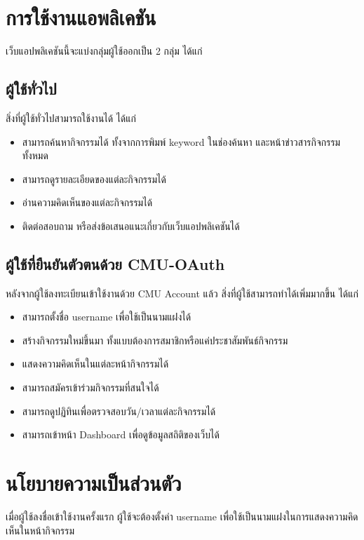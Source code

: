 \section{การใช้งานแอพลิเคชัน}
เว็บแอปพลิเคชันนี้จะแบ่งกลุ่มผู้ใช้ออกเป็น 2 กลุ่ม ได้แก่
\subsection{ผู้ใช้ทั่วไป}
สิ่งที่ผู้ใช้ทั่วไปสามารถใช้งานได้ ได้แก่
\begin{itemize}
    \item สามารถค้นหากิจกรรมได้ ทั้งจากการพิมพ์ keyword ในช่องค้นหา และหน้าข่าวสารกิจกรรมทั้งหมด
    \item สามารถดูรายละเอียดของแต่ละกิจกรรมได้
    \item อ่านความคิดเห็นของแต่ละกิจกรรมได้
    \item ติดต่อสอบถาม หรือส่งข้อเสนอแนะเกี่ยวกับเว็บแอปพลิเคชันได้
\end{itemize}
\subsection{ผู้ใช้ที่ยืนยันตัวตนด้วย CMU-OAuth}
หลังจากผู้ใช้ลงทะเบียนเข้าใช้งานด้วย CMU Account แล้ว สิ่งที่ผู้ใช้สามารถทำได้เพิ่มมากขึ้น ได้แก่
\begin{itemize}
    \item สามารถตั้งชื่อ username เพื่อใช้เป็นนามแฝงได้
    \item สร้างกิจกรรมใหม่ขึ้นมา ทั้งแบบต้องการสมาชิกหรือแค่ประชาสัมพันธ์กิจกรรม
    \item แสดงความคิดเห็นในแต่ละหน้ากิจกรรมได้
    \item สามารถสมัครเข้าร่วมกิจกรรมที่สนใจได้
    \item สามารถดูปฏิทินเพื่อตรวจสอบวัน/เวลาแต่ละกิจกรรมได้
    \item สามารถเข้าหน้า Dashboard เพื่อดูข้อมูลสถิติของเว็บได้
\end{itemize}
\section{นโยบายความเป็นส่วนตัว}
เมื่อผู้ใช้ลงชื่อเข้าใช้งานครั้งแรก ผู้ใช้จะต้องตั้งค่า username เพื่อใช้เป็นนามแฝงในการแสดงความคิดเห็นในหน้ากิจกรรม


